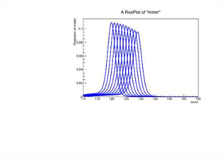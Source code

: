 \begin{figure}[hbp]
  \includegraphics[width=0.49\linewidth]{figures/signal_model/AppendixBdt/interpolation_VBF_cat11.pdf}
  \caption{}
  \label{fig:higgs_signalmodel_gluvbfc9c11}
\end{figure}




